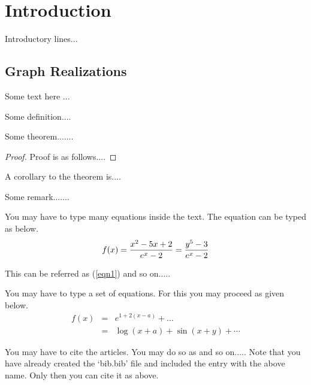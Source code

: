 \chapter{Introduction}

Introductory lines...



\section{Graph Realizations}

Some text here ...

\begin{definition}\label{abc5}
Some definition....
\end{definition}

\begin{theorem}
Some theorem.......
\end{theorem}

\begin{proof}
Proof is as follows....
\end{proof}


\begin{corollary}
A corollary to the theorem is....
\end{corollary}

\begin{remark}
Some remark.......
\end{remark}


You may have to type many equations inside the text.  The equation can be typed as below.
\begin{equation}\label{eqn1}
f(x) = \frac{x^2-5x+2}{e^x - 2} = {y^5-3 \over e^x-2} %
\end{equation}

This can be referred as (\ref{eqn1}) and so on.....

You may have to type a set of equations.  For this you may proceed as given below.
\begin{eqnarray}
f(x) &=& e^{1+2(x-a)} + \ldots   \nonumber   \\
  &=& \log(x+a) + \sin(x+y) + \cdots  \label{eqn2}
\end{eqnarray}


You may have to cite the articles.  You may do so as \cite{golub} and so on.....
Note that you have already created the `bib.bib' file and included the entry with the above name. Only
then you can cite it as above.  

